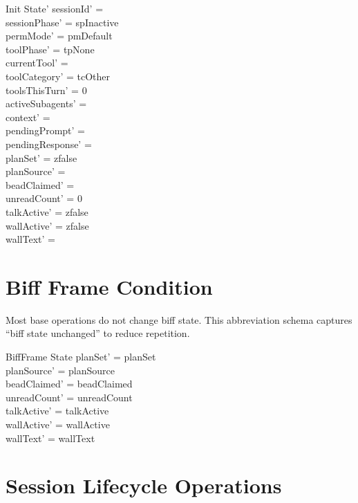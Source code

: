 \documentclass[a4paper,10pt,fleqn]{article}
\begin{document}
\begin{schema}{Init}
  State'
  \where
  sessionId' = \emptyset \\
  sessionPhase' = spInactive \\
  permMode' = pmDefault \\
  toolPhase' = tpNone \\
  currentTool' = \emptyset \\
  toolCategory' = tcOther \\
  toolsThisTurn' = 0 \\
  activeSubagents' = \emptyset \\
  context' = \langle \rangle \\
  pendingPrompt' = \emptyset \\
  pendingResponse' = \emptyset \\
  planSet' = zfalse \\
  planSource' = \emptyset \\
  beadClaimed' = \emptyset \\
  unreadCount' = 0 \\
  talkActive' = zfalse \\
  wallActive' = zfalse \\
  wallText' = \emptyset
\end{schema}

\section{Biff Frame Condition}

Most base operations do not change biff state. This abbreviation
schema captures ``biff state unchanged'' to reduce repetition.

\begin{schema}{BiffFrame}
  \Delta State
  \where
  planSet' = planSet \\
  planSource' = planSource \\
  beadClaimed' = beadClaimed \\
  unreadCount' = unreadCount \\
  talkActive' = talkActive \\
  wallActive' = wallActive \\
  wallText' = wallText
\end{schema}

\section{Session Lifecycle Operations}
\end{document}
